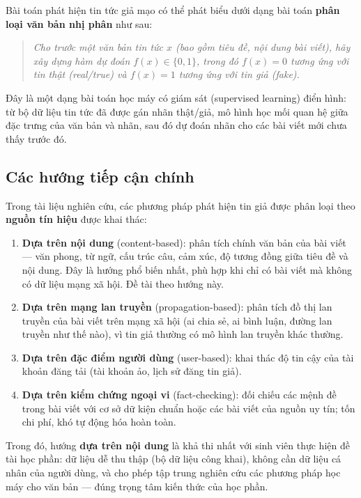 Bài toán phát hiện tin tức giả mạo có thể phát biểu dưới dạng bài toán \textbf{phân loại văn bản nhị phân} như sau:

\begin{quote}
\textit{Cho trước một văn bản tin tức $x$ (bao gồm tiêu đề, nội dung bài viết), hãy xây dựng hàm dự đoán $f(x) \in \{0, 1\}$, trong đó $f(x) = 0$ tương ứng với tin thật (real/true) và $f(x) = 1$ tương ứng với tin giả (fake).}
\end{quote}

Đây là một dạng bài toán học máy có giám sát (supervised learning) điển hình: từ bộ dữ liệu tin tức đã được gán nhãn thật/giả, mô hình học mối quan hệ giữa đặc trưng của văn bản và nhãn, sau đó dự đoán nhãn cho các bài viết mới chưa thấy trước đó.

\subsection{Các hướng tiếp cận chính}

Trong tài liệu nghiên cứu, các phương pháp phát hiện tin giả được phân loại theo \textbf{nguồn tín hiệu} được khai thác:

\begin{enumerate}
    \item \textbf{Dựa trên nội dung} (content-based): phân tích chính văn bản của bài viết --- văn phong, từ ngữ, cấu trúc câu, cảm xúc, độ tương đồng giữa tiêu đề và nội dung. Đây là hướng phổ biến nhất, phù hợp khi chỉ có bài viết mà không có dữ liệu mạng xã hội. Đề tài theo hướng này.
    \item \textbf{Dựa trên mạng lan truyền} (propagation-based): phân tích đồ thị lan truyền của bài viết trên mạng xã hội (ai chia sẻ, ai bình luận, đường lan truyền như thế nào), vì tin giả thường có mô hình lan truyền khác thường.
    \item \textbf{Dựa trên đặc điểm người dùng} (user-based): khai thác độ tin cậy của tài khoản đăng tải (tài khoản ảo, lịch sử đăng tin giả).
    \item \textbf{Dựa trên kiểm chứng ngoại vi} (fact-checking): đối chiếu các mệnh đề trong bài viết với cơ sở dữ kiện chuẩn hoặc các bài viết của nguồn uy tín; tốn chi phí, khó tự động hóa hoàn toàn.
\end{enumerate}

Trong đó, hướng \textbf{dựa trên nội dung} là khả thi nhất với sinh viên thực hiện đề tài học phần: dữ liệu dễ thu thập (bộ dữ liệu công khai), không cần dữ liệu cá nhân của người dùng, và cho phép tập trung nghiên cứu các phương pháp học máy cho văn bản --- đúng trọng tâm kiến thức của học phần.


